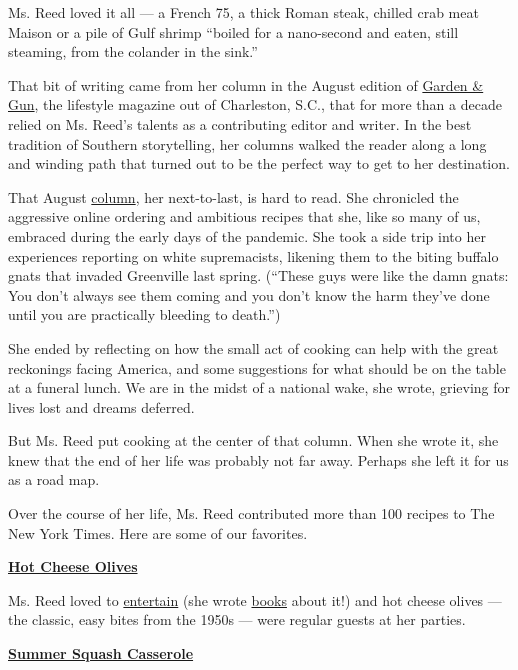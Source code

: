 Ms. Reed loved it all --- a French 75, a thick Roman steak, chilled crab
meat Maison or a pile of Gulf shrimp ``boiled for a nano-second and
eaten, still steaming, from the colander in the sink.''

That bit of writing came from her column in the August edition of
\href{https://gardenandgun.com/}{Garden \& Gun}, the lifestyle magazine
out of Charleston, S.C., that for more than a decade relied on Ms.
Reed's talents as a contributing editor and writer. In the best
tradition of Southern storytelling, her columns walked the reader along
a long and winding path that turned out to be the perfect way to get to
her destination.

That August
\href{https://gardenandgun.com/articles/cooking-through-covid/}{column},
her next-to-last, is hard to read. She chronicled the aggressive online
ordering and ambitious recipes that she, like so many of us, embraced
during the early days of the pandemic. She took a side trip into her
experiences reporting on white supremacists, likening them to the biting
buffalo gnats that invaded Greenville last spring. (``These guys were
like the damn gnats: You don't always see them coming and you don't know
the harm they've done until you are practically bleeding to death.'')

She ended by reflecting on how the small act of cooking can help with
the great reckonings facing America, and some suggestions for what
should be on the table at a funeral lunch. We are in the midst of a
national wake, she wrote, grieving for lives lost and dreams deferred.

But Ms. Reed put cooking at the center of that column. When she wrote
it, she knew that the end of her life was probably not far away. Perhaps
she left it for us as a road map.

Over the course of her life, Ms. Reed contributed more than 100 recipes
to The New York Times. Here are some of our favorites.

\textbf{\href{https://cooking.nytimes3xbfgragh.onion/recipes/8665-hot-cheese-olives}{Hot
Cheese Olives}}

Ms. Reed loved to
\href{https://gardenandgun.com/articles/secrets-of-a-southern-hostess/}{entertain}
(she wrote
\href{https://www.goodreads.com/book/show/26067552-julia-reed-s-south}{books}
about it!) and hot cheese olives --- the classic, easy bites from the
1950s --- were regular guests at her parties.

\textbf{\href{https://cooking.nytimes3xbfgragh.onion/recipes/11404-summer-squash-casserole}{Summer
Squash Casserole}}

